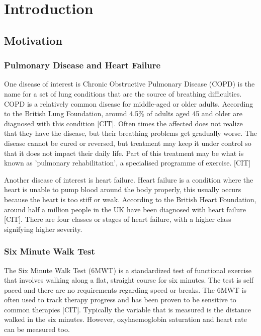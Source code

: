 \part{Introduction}

    \chapter{Motivation}

        \section{Pulmonary Disease and Heart Failure}

            One disease of interest is Chronic Obstructive Pulmonary Disease (COPD) is the name for a set of lung conditions that are the source of breathing difficulties. COPD is a relatively common disease for middle-aged or older adults. According to the British Lung Foundation, around 4.5\% of adults aged 45 and older are diagnosed with this condition [CIT]. Often times the affected does not realize that they have the disease, but their breathing problems get gradually worse. The disease cannot be cured or reversed, but treatment may keep it under control so that it does not impact their daily life. Part of this treatment may be what is known as 'pulmonary rehabilitation', a specialised programme of exercise. [CIT]

            Another disease of interest is heart failure. Heart failure is a condition where the heart is unable to pump blood around the body properly, this usually occurs because the heart is too stiff or weak. According to the British Heart Foundation, around half a million people in the UK have been diagnosed with heart failure [CIT]. There are four classes or stages of heart failure, with a higher class signifying higher severity. 

        \section{Six Minute Walk Test}

            The Six Minute Walk Test (6MWT) is a standardized test of functional exercise that involves walking along a flat, straight course for six minutes. The test is self paced and there are no requirements regarding speed or breaks. The 6MWT is often used to track therapy progress and has been proven to be sensitive to common therapies [CIT]. Typically the variable that is measured is the distance walked in the six minutes. However, oxyhaemoglobin saturation and heart rate can be measured too. 


